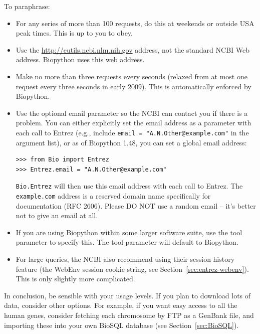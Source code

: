\documentclass{report}
\begin{document}
To paraphrase:

\begin{itemize}
\item For any series of more than 100 requests, do this at weekends or outside USA peak times.  This is up to you to obey.
\item Use the \url{http://eutils.ncbi.nlm.nih.gov} address, not the standard NCBI Web address.  Biopython uses this web address.
\item Make no more than three requests every seconds (relaxed from at most one request every three seconds in early 2009).  This is automatically enforced by Biopython.
\item Use the optional email parameter so the NCBI can contact you if there is a problem.  You can either explicitly set the email address as a parameter with each call to Entrez (e.g., include {\tt email = "A.N.Other@example.com"} in the argument list), or as of Biopython 1.48, you can set a global email address:
\begin{verbatim}
>>> from Bio import Entrez
>>> Entrez.email = "A.N.Other@example.com"
\end{verbatim}
{\tt Bio.Entrez} will then use this email address with each call to Entrez.  The {\tt example.com} address is a reserved domain name specifically for documentation (RFC 2606).  Please DO NOT use a random email -- it's better not to give an email at all.
\item If you are using Biopython within some larger software suite, use the tool parameter to specify this.  The tool parameter will default to Biopython.
\item For large queries, the NCBI also recommend using their session history feature (the WebEnv session cookie string, see Section~\ref{sec:entrez-webenv}).  This is only slightly more complicated.
\end{itemize}

In conclusion, be sensible with your usage levels.  If you plan to download lots of data, consider other options.  For example, if you want easy access to all the human genes, consider fetching each chromosome by FTP as a GenBank file, and importing these into your own BioSQL database (see Section~\ref{sec:BioSQL}).
\end{document}
